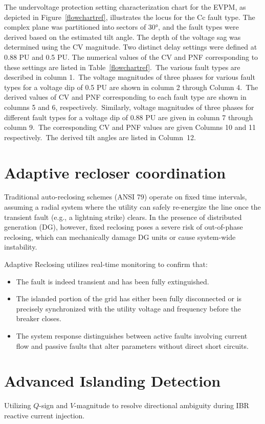 The undervoltage protection setting characterization chart for the EVPM, as depicted in Figure~\ref{flowchartref}, illustrates the locus for the Cc fault type. The complex plane was partitioned into sectors of 30°, and the fault types were derived based on the estimated tilt angle. The depth of the voltage sag was determined using the CV magnitude. Two distinct delay settings were defined at 0.88 PU and 0.5 PU. 
The numerical values of the CV and PNF corresponding to these settings are listed in Table~\ref{flowchartref}.~The various fault types are described in column 1.~The voltage magnitudes of three phases for various fault types for a voltage dip of 0.5 PU are shown in column 2 through Column 4.~The derived values of CV and PNF corresponding to each fault type are shown in columns 5 and 6, respectively.~Similarly, voltage magnitudes of three phases for different fault types for a voltage dip of 0.88 PU are given in column 7 through column 9.~The corresponding CV and PNF values are given Columns 10 and 11 respectively.~The  derived tilt angles are listed in Column~12.

\section{Adaptive recloser coordination}
Traditional auto-reclosing schemes (ANSI 79) operate on fixed time intervals, assuming a radial system where the utility can safely re-energize the line once the transient fault (e.g., a lightning strike) clears. In the presence of distributed generation (DG), however, fixed reclosing poses a severe risk of out-of-phase reclosing, which can mechanically damage DG units or cause system-wide instability.

Adaptive Reclosing utilizes real-time monitoring to confirm that:
\begin{itemize}
    \item The fault is indeed transient and has been fully extinguished.
    \item The islanded portion of the grid has either been fully disconnected or is precisely synchronized with the utility voltage and frequency before the breaker closes.
    \item The system response distinguishes between active faults involving current flow and passive faults that alter parameters without direct short circuits.
\end{itemize}




\section{Advanced Islanding Detection}
Utilizing $Q$-sign and $V$-magnitude to resolve directional ambiguity during IBR reactive current injection.

